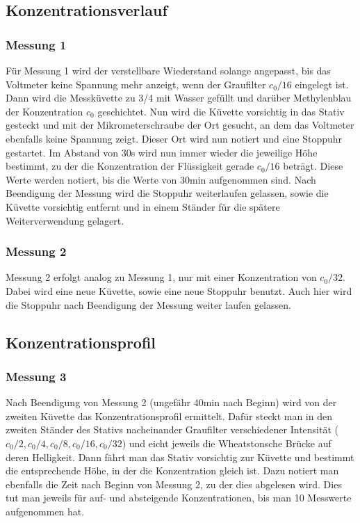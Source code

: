\documentclass[12pt,a4paper,titlepage,headinclude,bibtotoc]{scrartcl}
\begin{document}
\subsection{Konzentrationsverlauf}
\subsubsection*{Messung 1}
\label{sec:messung1}
Für Messung 1 wird der verstellbare Wiederstand solange angepasst, bis das Voltmeter keine Spannung mehr anzeigt, wenn der Graufilter $c_0/16$ eingelegt ist.
Dann wird die Messküvette zu 3/4 mit Wasser gefüllt und darüber Methylenblau der Konzentration $c_0$ geschichtet.
Nun wird die Küvette vorsichtig in das Stativ gesteckt und mit der Mikrometerschraube der Ort gesucht, an dem das Voltmeter ebenfalls keine Spannung zeigt.
Dieser Ort wird nun notiert und eine Stoppuhr gestartet.
Im Abstand von 30s wird nun immer wieder die jeweilige Höhe bestimmt, zu der die Konzentration der Flüssigkeit gerade $c_0/16$ beträgt.
Diese Werte werden notiert, bis die Werte von 30min aufgenommen sind.
Nach Beendigung der Messung wird die Stoppuhr weiterlaufen gelassen, sowie die Küvette vorsichtig entfernt und in einem Ständer für die spätere Weiterverwendung gelagert.
\subsubsection*{Messung 2}
Messung 2 erfolgt analog zu Messung 1, nur mit einer Konzentration von $c_0/32$.
Dabei wird eine neue Küvette, sowie eine neue Stoppuhr benutzt.
Auch hier wird die Stoppuhr nach Beendigung der Messung weiter laufen gelassen.

\subsection{Konzentrationsprofil}
\subsubsection*{Messung 3}
Nach Beendigung von Messung 2 (ungefähr 40min nach Beginn) wird von der zweiten Küvette das Konzentrationsprofil ermittelt.
Dafür steckt man in den zweiten Ständer des Stativs nacheinander Graufilter verschiedener Intensität ($c_0/2, c_0/4, c_0/8, c_0/16, c_0/32$) und eicht jeweils die Wheatstonsche Brücke auf deren Helligkeit.
Dann fährt man das Stativ vorsichtig zur Küvette und bestimmt die entsprechende Höhe, in der die Konzentration gleich ist.
Dazu notiert man ebenfalls die Zeit nach Beginn von Messung 2, zu der dies abgelesen wird.
Dies tut man jeweils für auf- und absteigende Konzentrationen, bis man 10 Messwerte aufgenommen hat.
\end{document}
